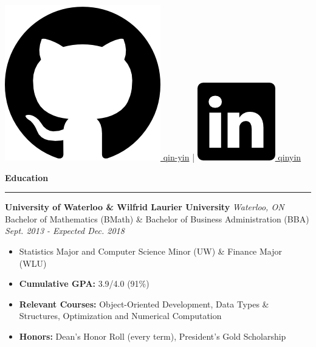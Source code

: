 \documentclass{letter}
\begin{document}
\begin{center}
{			\href{https://github.com/qin-yin}{\includegraphics[scale=0.03]{icons/github.png} \hspace{0pt} qin-yin} \hspace{2pt} | \hspace{2pt} 
			\href{https://linkedin.com/in/qinyin}{\includegraphics[scale=0.055]{icons/linkedin.png} \hspace{1pt} qinyin}}
	\end{center}
	
	
	\begin{flushleft}
		{\Large \textbf{Education}}
		\rule[5pt]{\textwidth}{0.4pt}
		{\large \textbf{University of Waterloo \& Wilfrid Laurier University}} \hfill \textit{Waterloo, ON}\\
		Bachelor of Mathematics (BMath) \& Bachelor of Business Administration (BBA) \hfill \textit{Sept. 2013 - Expected Dec. 2018}
		\vspace{-7.5pt}
		\begin{itemize}
			\item Statistics Major and Computer Science Minor (UW) \& Finance Major (WLU) \vspace{-3pt}
			\item \textbf{Cumulative GPA:} 3.9/4.0 (91\%) \vspace{-3pt}
			\item \textbf{Relevant Courses:} Object-Oriented Development, Data Types \& Structures, Optimization and Numerical Computation \vspace{-3pt}
			\item \textbf{Honors:} Dean's Honor Roll (every term), President's Gold Scholarship
		\end{itemize}
	\end{flushleft}
	
\end{document}
